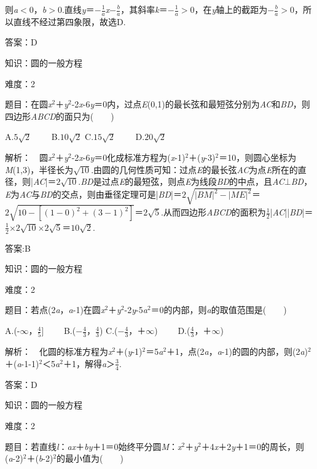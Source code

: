 \documentclass{article} %
\begin{document}
则\textit{a}$\mathrm{<}$0，\textit{b}$\mathrm{>}$0.直线\textit{y}＝$-\frac{1}{a}$\textit{x}$-\frac{b}{a}$，其斜率\textit{k}＝$-\frac{1}{a}$$\mathrm{>}$0，在\textit{y}轴上的截距为$-\frac{b}{a}$$\mathrm{>}$0，所以直线不经过第四象限，故选D.

答案：D

知识：圆的一般方程

难度：2

题目：在圆\textit{x}${}^{2}$＋\textit{y}${}^{2}$-2\textit{x}-6\textit{y}＝0内，过点\textit{E}(0,1)的最长弦和最短弦分别为\textit{AC}和\textit{BD}，则四边形\textit{ABCD}的面只为(　　)

A.$5\sqrt{2}$　　 B.$10\sqrt{2}$  C.$15\sqrt{2}$　　 D.$20\sqrt{2}$

解析：　圆\textit{x}${}^{2}$＋\textit{y}${}^{2}$-2\textit{x}-6\textit{y}＝0化成标准方程为(\textit{x}-1)${}^{2}$＋(\textit{y}-3)${}^{2}$＝10，则圆心坐标为\textit{M}(1,3)，半径长为$\sqrt{10}$.由圆的几何性质可知：过点\textit{E}的最长弦\textit{AC}为点\textit{E}所在的直径，则|\textit{AC}|＝$2\sqrt{10}$.\textit{BD}是过点\textit{E}的最短弦，则点\textit{E}为线段\textit{BD}的中点，且\textit{AC}$\mathrm{\bot}$\textit{BD}，\textit{E}为\textit{AC}与\textit{BD}的交点，则由垂径定理可是|\textit{BD}|＝$2\sqrt{|BM|^2-|ME|^2}$＝$2\sqrt{10-[(1-0)^2+(3-1)^2]}$＝$2\sqrt{5}$.从而四边形\textit{ABCD}的面积为$\frac{1}{2}$|\textit{AC}||\textit{BD}|＝$\frac{1}{2}$$\mathrm{\times}$$2\sqrt{10}$$\mathrm{\times}$$2\sqrt{5}$＝$10\sqrt{2}$.

答案:B

知识：圆的一般方程

难度：2

题目：若点(2\textit{a}，\textit{a}-1)在圆\textit{x}${}^{2}$＋\textit{y}${}^{2}$-2\textit{y}-5\textit{a}${}^{2}$＝0的内部，则\textit{a}的取值范围是(　　)

A.(-$\mathrm{\infty}$，$\frac{4}{5}$]　　 B.($-\frac{4}{3}$，$\frac{4}{3}$) C.($-\frac{4}{3}$，＋$\mathrm{\infty}$)　　 D.($\frac{4}{3}$，＋$\mathrm{\infty}$)

解析：　化圆的标准方程为\textit{x}${}^{2}$＋(\textit{y}-1)${}^{2}$＝5\textit{a}${}^{2}$＋1，点(2\textit{a}，\textit{a}-1)的圆的内部，则(2\textit{a})${}^{2}$＋(\textit{a}-1-1)${}^{2}$＜5\textit{a}${}^{2}$＋1，解得\textit{a}＞$\frac{3}{4}$.

答案：D

知识：圆的一般方程

难度：2

题目：若直线\textit{l}：\textit{ax}＋\textit{by}＋1＝0始终平分圆\textit{M}：\textit{x}${}^{2}$＋\textit{y}${}^{2}$＋4\textit{x}＋2\textit{y}＋1＝0的周长，则(\textit{a}-2)${}^{2}$＋(\textit{b}-2)${}^{2}$的最小值为(　　)
\end{document}
